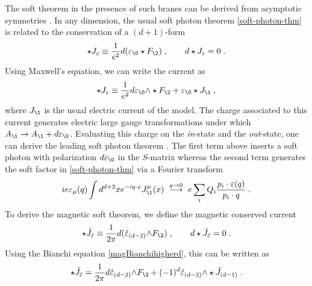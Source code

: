 \documentclass[11pt]{article}
\def\ve{{\varepsilon}}
\def\w{{\wedge}}
\begin{document}
The soft theorem in the presence of such branes can be derived from asymptotic symmetries \cite{Strominger:2017zoo}. In any dimension, the usual soft photon theorem \eqref{soft-photon-thm} is related to the conservation of a $(d+1)$-form
\begin{equation}
\begin{split}
\star J_\ve \equiv \frac{1}{e^2} d ( \ve_\0 \star F_\2 ) \; , \qquad d \star J_\ve = 0 \; . 
\end{split}
\end{equation}
Using Maxwell's equation, we can write the current as
\begin{equation}
\begin{split}
\star J_\ve \equiv \frac{1}{e^2}  d \ve_\0 \w \star F_\2 +  \ve_\0 \star J_\1 \; , 
\end{split}
\end{equation}
where $J_\1$ is the usual electric current of the model. The charge associated to this current generates electric large gauge transformations under which $A_\1 \to A_\1 + d \ve_\0$. Evaluating this charge on the \emph{in}-state and the \emph{out}-state, one can derive the leading soft photon theorem \cite{He:2014cra,He:2019jjk}. The first term above inserts a soft photon with polarization $d\ve_\0$ in the $S$-matrix whereas the second term generates the soft factor in \eqref{soft-photon-thm} via a Fourier transform
\begin{equation}
\begin{split}
  i e \ve_\mu (q)\int d^{d+2} x e^{- i q \cdot x } J_\1^\mu ( x )  ~ \stackrel{q \to 0}{\longrightarrow} ~ e \sum_i Q_i \frac{ p_i \cdot \ve(q) }{ p_i \cdot q  } \; .
\end{split}
\end{equation}
To derive the magnetic soft theorem, we define the magnetic conserved current
\begin{equation}
\begin{split}
\label{eq:HigherMagCurrent}
\star {\tilde J}_{\tilde \ve} \equiv  \frac{1}{2\pi} d( {\tilde \ve}_{(d-2)} \w F_\2 ) \; , \qquad d \star {\tilde J}_{\tilde \ve} = 0 \; . 
\end{split}
\end{equation}
Using the Bianchi equation \eqref{magBianchihigherd}, this can be written as
\begin{equation}
\begin{split}\label{astJdef}
\star {\tilde J}_{\tilde \ve} = \frac{1}{2\pi} d  {\tilde \ve}_{(d-2)} \w F_\2  + (-1)^d  {\tilde \ve}_{(d-2)} \w \star {\tilde J}_{(d-1)} \; .
\end{split}
\end{equation}
\end{document}
